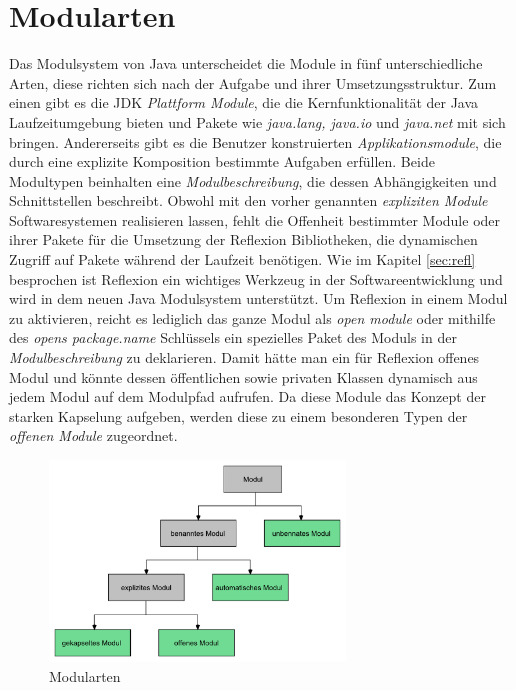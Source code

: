   \section{Modularten} \label{Modularten}
    Das Modulsystem von Java unterscheidet die Module in fünf unterschiedliche Arten, diese richten sich nach der Aufgabe und ihrer Umsetzungsstruktur. Zum einen gibt es die JDK \textit{Plattform Module}, die die Kernfunktionalität der Java Laufzeitumgebung bieten und Pakete wie \textit{java.lang, java.io} und \textit{java.net} mit sich bringen. Andererseits gibt es die Benutzer konstruierten \textit{Applikationsmodule}, die durch eine explizite Komposition bestimmte Aufgaben erfüllen. Beide Modultypen beinhalten eine \textit{Modulbeschreibung}, die dessen Abhängigkeiten und Schnittstellen beschreibt.\newline
    Obwohl mit den vorher genannten \textit{expliziten Module} Softwaresystemen realisieren lassen, fehlt die Offenheit bestimmter Module oder ihrer Pakete für die Umsetzung der Reflexion Bibliotheken, die dynamischen Zugriff auf Pakete während der Laufzeit benötigen. Wie im Kapitel \ref{sec:refl} besprochen ist Reflexion ein wichtiges Werkzeug in der Softwareentwicklung und wird in dem neuen Java Modulsystem unterstützt. Um Reflexion in einem Modul zu aktivieren, reicht es lediglich das ganze Modul als \textit{open module} oder mithilfe des \textit{opens package.name} Schlüssels ein spezielles Paket des Moduls in der \textit{Modulbeschreibung} zu deklarieren. Damit hätte man ein für Reflexion offenes Modul und könnte dessen öffentlichen sowie privaten Klassen dynamisch aus jedem Modul auf dem Modulpfad aufrufen. Da diese Module das Konzept der starken Kapselung aufgeben, werden diese zu einem besonderen Typen der \textit{offenen Module} zugeordnet. \cite{modulMitJava9,java9modRevealed,modulProgJava9,explorJava9}

    \begin{figure}[h]
      \centering
      \includegraphics[width=0.7\textwidth]{material/images/module-tree.pdf}
      \caption{Modularten \cite{modulMitJava9}}
      \label{fig:modtree}
    \end{figure}

